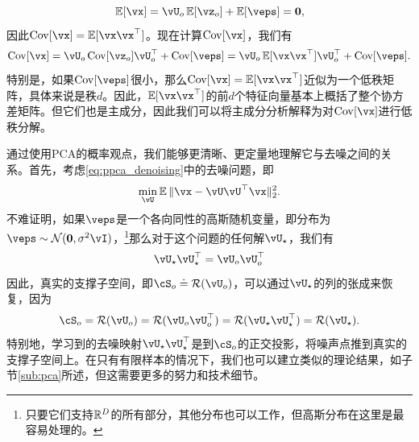 \documentclass[../../book-main_zh.tex]{subfiles}
\begin{document}
\begin{equation}
    \Ex[\vx] = \vU_{o}\Ex[\vz_{o}] + \Ex[\veps] = \vzero,
\end{equation}
因此\(\Cov[\vx] = \Ex[\vx\vx^{\top}]\)。现在计算\(\Cov[\vx]\)，我们有
\begin{equation}
    \Cov[\vx] = \vU_{o}\Cov[\vz_{o}]\vU_{o}^{\top} + \Cov[\veps] = \vU_{o}\Ex[\vx\vx^{\top}]\vU_{o}^{\top} + \Cov[\veps].
\end{equation}
特别是，如果\(\Cov[\veps]\)很小，那么\(\Cov[\vx] = \Ex[\vx\vx^{\top}]\)近似为一个低秩矩阵，具体来说是秩\(d\)。因此，\(\Ex[\vx\vx^{\top}]\)的前\(d\)个特征向量基本上概括了整个协方差矩阵。但它们也是主成分，因此我们可以将主成分分析解释为对\(\Cov[\vx]\)进行低秩分解。

\begin{remark}
    通过使用PCA的概率观点，我们能够更清晰、更定量地理解它与去噪之间的关系。首先，考虑\eqref{eq:ppca_denoising}中的去噪问题，即
    \begin{equation}
        \min_{\vU}\Ex\norm{\vx - \vU\vU^{\top}\vx}_{2}^{2}.
    \end{equation}
    不难证明，如果\(\veps\)是一个各向同性的高斯随机变量，即分布为\(\veps \sim \dNorm(\vzero, \sigma^{2}\vI)\)，\footnote{只要它们支持\(\mathbb{R}^{D}\)的所有部分，其他分布也可以工作，但高斯分布在这里是最容易处理的。}那么对于这个问题的任何解\(\vU_{\star}\)，我们有
    \begin{equation}
        \vU_{\star}\vU_{\star}^{\top} = \vU_{o}\vU_{o}^{\top}
    \end{equation}
    因此，真实的支撑子空间，即\(\cS_{o} \doteq \Range(\vU_{o})\)，可以通过\(\vU_{\star}\)的列的张成来恢复，因为
    \begin{equation}
        \cS_{o} = \Range(\vU_{o}) = \Range(\vU_{o}\vU_{o}^{\top}) = \Range(\vU_{\star}\vU_{\star}^{\top}) = \Range(\vU_{\star}).
    \end{equation}
    特别地，学习到的去噪映射\(\vU_{\star}\vU_{\star}^{\top}\)是到\(\cS_{o}\)的正交投影，将噪声点推到真实的支撑子空间上。在只有有限样本的情况下，我们也可以建立类似的理论结果，如子节\ref{sub:pca}所述，但这需要更多的努力和技术细节。%
\end{remark}


\end{document}
